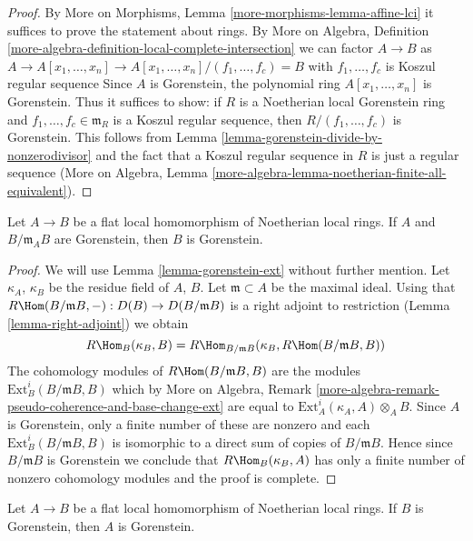 \begin{proof}
By More on Morphisms, Lemma \ref{more-morphisms-lemma-affine-lci}
it suffices to prove the statement about rings.
By More on Algebra, Definition
\ref{more-algebra-definition-local-complete-intersection}
we can factor $A \to B$ as
$A \to A[x_1, \ldots, x_n] \to
A[x_1, \ldots, x_n]/(f_1, \ldots, f_c) = B$
with $f_1, \ldots, f_c$ is Koszul regular sequence
Since $A$ is Gorenstein, the polynomial ring
$A[x_1, \ldots, x_n]$ is Gorenstein.
Thus it suffices to show: if $R$ is a Noetherian local
Gorenstein ring and $f_1, \ldots, f_c \in \mathfrak m_R$
is a Koszul regular sequence, then $R/(f_1, \ldots, f_c)$
is Gorenstein. This follows from
Lemma \ref{lemma-gorenstein-divide-by-nonzerodivisor} and
the fact that a Koszul regular sequence in $R$ is just a
regular sequence (More on Algebra, Lemma
\ref{more-algebra-lemma-noetherian-finite-all-equivalent}).
\end{proof}

\begin{lemma}
\label{lemma-flat-over-gorenstein-gorenstein-fibre}
Let $A \to B$ be a flat local homomorphism of Noetherian local rings.
If $A$ and $B/\mathfrak m_A B$ are Gorenstein, then $B$ is Gorenstein.
\end{lemma}

\begin{proof}
We will use Lemma \ref{lemma-gorenstein-ext} without further mention.
Let $\kappa_A$, $\kappa_B$ be the residue field of $A$, $B$.
Let $\mathfrak m \subset A$ be the maximal ideal. Using that
$R\Hom(B/\mathfrak m B, -) : D(B) \to D(B/\mathfrak m B)$ is a right adjoint
to restriction (Lemma \ref{lemma-right-adjoint}) we obtain
$$
R\Hom_B(\kappa_B, B) =
R\Hom_{B/\mathfrak m B}(\kappa_B, R\Hom(B/\mathfrak m B, B))
$$
The cohomology modules of $R\Hom(B/\mathfrak m B, B)$ are the
modules $\text{Ext}^i_B(B/\mathfrak mB, B)$ which by
More on Algebra, Remark
\ref{more-algebra-remark-pseudo-coherence-and-base-change-ext}
are equal to $\text{Ext}^i_A(\kappa_A, A) \otimes_A B$.
Since $A$ is Gorenstein, only a finite number of these are
nonzero and each $\text{Ext}^i_B(B/\mathfrak mB, B)$ is
isomorphic to a direct sum of copies of $B/\mathfrak m B$.
Hence since $B/\mathfrak mB$ is Gorenstein we conclude that
$R\Hom_B(\kappa_B, A)$ has only a finite number of nonzero
cohomology modules and the proof is complete.
\end{proof}

\begin{lemma}
\label{lemma-flat-under-gorenstein}
Let $A \to B$ be a flat local homomorphism of Noetherian local rings.
If $B$ is Gorenstein, then $A$ is Gorenstein.
\end{lemma}

